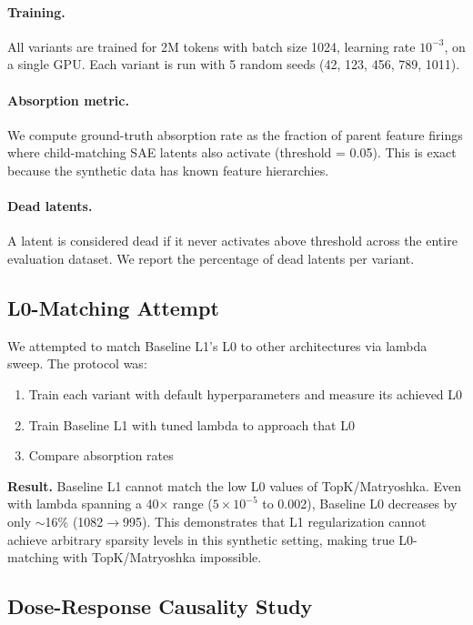 \documentclass{article}
\begin{document}
\paragraph{Training.} All variants are trained for 2M tokens with batch size 1024, learning rate $10^{-3}$, on a single GPU. Each variant is run with 5 random seeds (42, 123, 456, 789, 1011).

\paragraph{Absorption metric.} We compute ground-truth absorption rate as the fraction of parent feature firings where child-matching SAE latents also activate (threshold = 0.05). This is exact because the synthetic data has known feature hierarchies.

\paragraph{Dead latents.} A latent is considered dead if it never activates above threshold across the entire evaluation dataset. We report the percentage of dead latents per variant.

\subsection{L0-Matching Attempt}

We attempted to match Baseline L1's L0 to other architectures via lambda sweep. The protocol was:
\begin{enumerate}
    \item Train each variant with default hyperparameters and measure its achieved L0
    \item Train Baseline L1 with tuned lambda to approach that L0
    \item Compare absorption rates
\end{enumerate}

\textbf{Result.} Baseline L1 cannot match the low L0 values of TopK/Matryoshka. Even with lambda spanning a 40$\times$ range ($5\times10^{-5}$ to 0.002), Baseline L0 decreases by only $\sim$16\% (1082$\rightarrow$995). This demonstrates that L1 regularization cannot achieve arbitrary sparsity levels in this synthetic setting, making true L0-matching with TopK/Matryoshka impossible.

\subsection{Dose-Response Causality Study}
\end{document}
